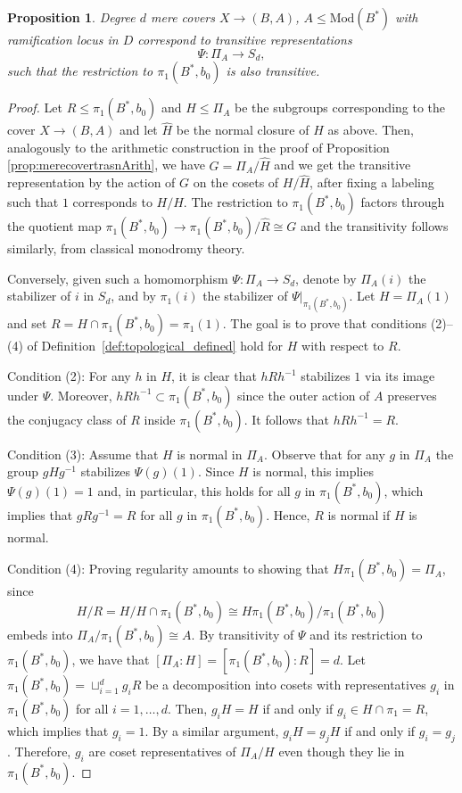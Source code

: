 \documentclass[10pt]{amsart}
\newtheorem{proposition}[theorem]{Proposition}
\theoremstyle{definition}
\begin{document}
\begin{proposition}{\label{prop:mereCoverstransTop}}
  Degree $d$ mere covers $X \rightarrow (B,A)$, $A \leq \mathrm{Mod}(B^*)$ with ramification locus in $D$ correspond to transitive representations 
  \[
    \Psi \colon \Pi_A \longrightarrow S_d,
  \]
  such that the restriction to $\pi_1(B^*,b_0)$ is also transitive.
\end{proposition}
\begin{proof}
Let $R \leq \pi_1(B^*,b_0)$ and $H\leq \Pi_A$ be the subgroups corresponding to the cover $X\rightarrow (B,A)$ and let $\widehat{H}$ be the normal closure of $H$ as above. Then, analogously to the arithmetic construction in the proof of Proposition \ref{prop:merecovertrasnArith}, we have $G = \Pi_A/\widehat{H}$ and we get the transitive representation by the action of $G$ on the cosets of $H/\widehat{H}$, after fixing a labeling such that $1$ corresponds to $H/\widehat{H}$. The restriction to $\pi_1(B^*,b_0)$ factors through the quotient map $\pi_1(B^*,b_0) \rightarrow \pi_1(B^*,b_0)/\widehat{R} \cong G$ and the transitivity follows similarly, from classical monodromy theory.

Conversely, given such a homomorphism $\Psi \colon \Pi_A \to S_d$, denote by $\Pi_A(i)$ the stabilizer of $i$ in $S_d$, and by $\pi_1(i)$ the stabilizer of $\Psi|_{\pi_1(B^*,b_0)}$. Let $H=\Pi_A(1)$ and set $R=H\cap \pi_1(B^*,b_0) = \pi_1(1)$. The goal is to prove that conditions (2)–(4) of Definition~\ref{def:topological_defined} hold for $H$ with respect to $R$. 

Condition (2):  
For any $h$ in $H$, it is clear that $hRh^{-1}$ stabilizes $1$ via its image under $\Psi$. Moreover, $hRh^{-1} \subset \pi_1(B^*,b_0)$ since the outer action of $A$ preserves the conjugacy class of $R$ inside $\pi_1(B^*,b_0)$. It follows that $hRh^{-1} = R$. 

Condition (3):
Assume that $H$ is normal in $\Pi_A$. Observe that for any $g$ in $\Pi_A$ the group $gHg^{-1}$ stabilizes
$\Psi(g)(1)$. Since $H$ is normal, this implies $\Psi(g)(1)=1$ and, in particular, this holds for all $g$ in $\pi_1(B^*,b_0)$, which implies that $gRg^{-1} = R$ for all $g$ in $\pi_1(B^*,b_0)$. Hence, $R$ is normal if $H$ is normal.

Condition (4):
Proving regularity amounts to showing that $H \pi_1(B^*,b_0) = \Pi_A$, since 
$$H/R = H/H\cap \pi_1(B^*,b_0) \cong H\pi_1(B^*,b_0)/\pi_1(B^*,b_0)$$ 
embeds into $\Pi_A/\pi_1(B^*,b_0) \cong A$. By transitivity of $\Psi$ and its restriction to $\pi_1(B^*,b_0)$, we have that $[\Pi_A:H] = [\pi_1(B^*,b_0):R] = d$.
Let $\pi_1(B^*,b_0) = \sqcup_{i=1}^d g_iR$ be a decomposition into cosets with representatives $g_i$ in $\pi_1(B^*,b_0)$ for all $i=1,\ldots,d$. Then, $g_i H = H$ if and only if $g_i \in H\cap \pi_1 = R$, which implies that $g_i=1$. By a similar argument, $g_iH = g_j H$ if and only if $g_i=g_j$. Therefore, $g_i$ are coset representatives of $\Pi_A/H$ even though they lie in $\pi_1(B^*,b_0)$.
\end{proof}
\end{document}
